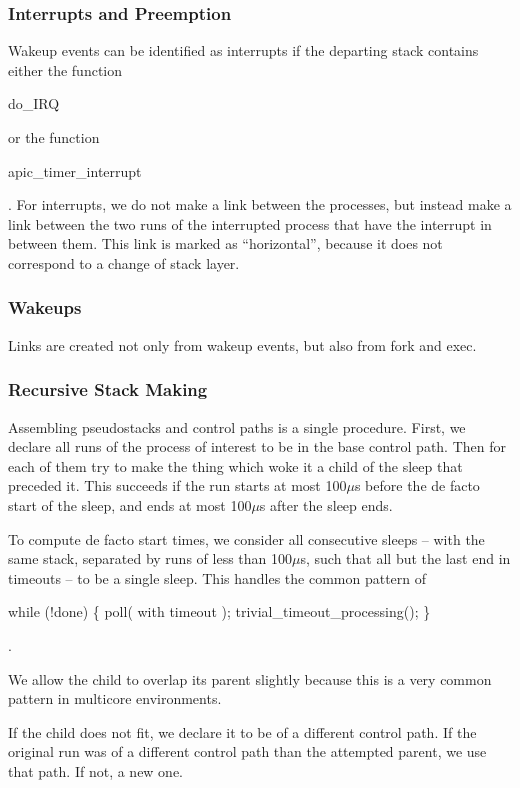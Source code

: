 \documentclass[10pt]{article}
\begin{document}
\subsubsection{Interrupts and Preemption}

Wakeup events can be identified as interrupts if the departing stack
contains either the function \begin{tt}do\_IRQ\end{tt} or the
  function \begin{tt}apic\_timer\_interrupt\end{tt}.  For interrupts, we do not make a link between the processes, but instead make a link between the two runs of the interrupted process that have the interrupt in between them.  This link is marked as ``horizontal'', because it does not correspond to a change of stack layer.

\subsubsection{Wakeups}

Links are created not only from wakeup events, but also from fork and exec.

\subsubsection{Recursive Stack Making}

Assembling pseudostacks and control paths is a single procedure.  First, we declare all runs of the process of interest to be in the base control path.  Then for each of them try to make the thing which woke it a child of the sleep that preceded it.  This succeeds if the run starts at most 100$\mu$s before the de facto start of the sleep, and ends at most 100$\mu$s after the sleep ends.  

To compute de facto start times, we consider all consecutive sleeps -- with the same stack, separated by runs of less than 100$\mu$s, such that all but the last end in timeouts -- to be a single sleep.  This handles the common pattern of \begin{tt}while (!done) \{ poll( with timeout ); trivial\_timeout\_processing(); \}\end{tt}.

We allow the child to overlap its parent slightly because this is a very common pattern in multicore environments.

If the child does not fit, we declare it to be of a different control path.  If the original run was of a different control path than the attempted parent, we use that path.  If not, a new one.
\end{document}
